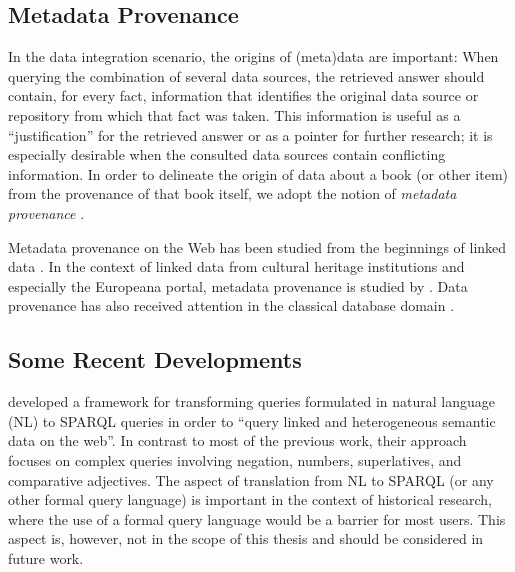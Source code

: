 \subsection{Metadata Provenance}
\label{sec:data_provenance}

In the data integration scenario, the origins of (meta)data are important:
When querying the combination of several data sources, the retrieved answer
should contain, for every fact, information that identifies the original data source or repository
from which that fact was taken.
This information is useful as a \enquote{justification} for the retrieved answer
or as a pointer for further research;
it is especially desirable when the consulted data sources contain conflicting information.
In order to delineate the origin of data about a book (or other item)
from the provenance of that book itself,
we adopt the notion of \emph{metadata provenance} \autocite{Eckert2012}.

Metadata provenance on the Web
has been studied
from the beginnings of linked data
\autocite[see, e.g.][]{Hartig2009,Moreau2008,Moreau2008a}.
In the context of linked data from cultural heritage institutions
and especially the Europeana portal,
metadata provenance is studied by
\citeauthor{Eckert2013} \autocite*{Eckert2013,Eckert2013a,Eckert2012}.
Data provenance has also received attention 
in the classical database domain
\autocite[see, e.g.,][Chapter 14]{Doan2012}.

\subsection{Some Recent Developments}

\textcite{Boumechaal2023} developed a framework for transforming queries formulated in natural language (NL)
to SPARQL queries in order to \enquote{query linked and heterogeneous semantic data on the web}.
In contrast to most of the previous work, their approach focuses on complex queries
involving negation, numbers, superlatives, and comparative adjectives.
The aspect of translation from NL to SPARQL (or any other formal query language)
is important in the context of historical research, where the use of a formal query language
would be a barrier for most users. This aspect is, however, not in the scope of this thesis
and should be considered in future work.

